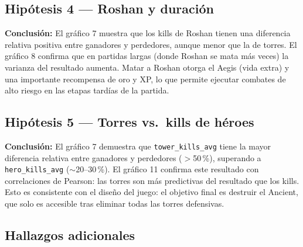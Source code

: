 \documentclass[12pt,a4paper]{article}
\begin{document}
\subsection*{Hip\'otesis 4 --- Roshan y duraci\'on}

\textbf{Conclusi\'on:} El gr\'afico 7 muestra que los kills de Roshan tienen una
diferencia relativa positiva entre ganadores y perdedores, aunque menor que la de
torres. El gr\'afico 8 confirma que en partidas largas (donde Roshan se mata m\'as
veces) la varianza del resultado aumenta. Matar a Roshan otorga el Aegis (vida
extra) y una importante recompensa de oro y XP, lo que permite ejecutar combates
de alto riesgo en las etapas tard\'ias de la partida.

\subsection*{Hip\'otesis 5 --- Torres vs.\ kills de h\'eroes}

\textbf{Conclusi\'on:} El gr\'afico 7 demuestra que \texttt{tower\_kills\_avg}
tiene la mayor diferencia relativa entre ganadores y perdedores ($>$50\,\%),
superando a \texttt{hero\_kills\_avg} ($\sim$20--30\,\%). El gr\'afico 11 confirma
este resultado con correlaciones de Pearson: las torres son m\'as predictivas del
resultado que los kills. Esto es consistente con el dise\~no del juego: el objetivo
final es destruir el Ancient, que solo es accesible tras eliminar todas las torres
defensivas.

\subsection*{Hallazgos adicionales}
\end{document}
